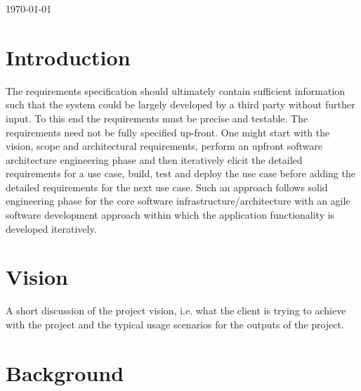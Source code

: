 \documentclass[a4paper,12pt]{article}
\begin{document}
\begin{titlepage}
{\large \today}\\[3cm] %


 

\vfill %

\end{titlepage}

\newpage

\section{Introduction}

The requirements specification should ultimately contain sufficient information such that the
system could be largely developed by a third party without further input. To this end the
requirements must be precise and testable.
The requirements need not be fully specified up-front. One might start with the vision, scope
and architectural requirements, perform an upfront software architecture engineering phase and
then iteratively elicit the detailed requirements for a use case, build, test and deploy the use
case before adding the detailed requirements for the next use case. Such an approach follows
solid engineering phase for the core software infrastructure/architecture with an agile software
development approach within which the application functionality is developed iteratively.

\section{Vision}

A short discussion of the project vision, i.e. what the client is trying to achieve with the project
and the typical usage scenarios for the outputs of the project.

\section{Background}
\end{document}
